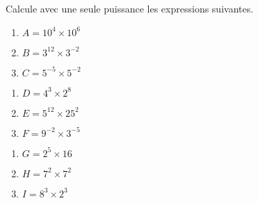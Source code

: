 
Calcule avec une seule puissance les expressions suivantes.

\begin{minipage}{0.3\linewidth}
\begin{enumerate}
\item $A= 10^4 \times 10^6$ 
\item $B= 3^{12} \times 3^{-2}$
\item $C= 5^{-5} \times 5^{-2}$
\end{enumerate}
\end{minipage}
\hfill
\begin{minipage}{0.3\linewidth}
\begin{enumerate}
\item $D= 4^3 \times 2^8$
\item $E= 5^{12} \times 25^2$
\item $F= 9^{-2} \times 3^{-5}$
\end{enumerate}
\end{minipage}
\hfill
\begin{minipage}{0.3\linewidth}
\begin{enumerate}
\item $G= 2^5 \times 16$
\item $H= 7^2 \times 7^2$
\item $I= 8^{3} \times 2^{3}$
\end{enumerate}
\end{minipage}